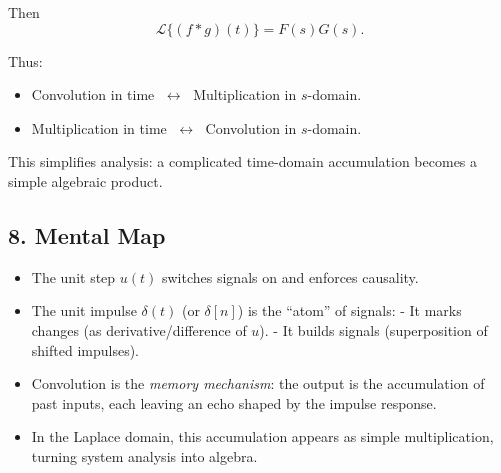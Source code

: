 \documentclass[12pt,a4paper]{article}
\begin{document}
		Then
		$$
		\mathcal{L}\{(f*g)(t)\} = F(s)G(s).
		$$
		
		Thus:
		\begin{itemize}
			\item Convolution in time $\;\longleftrightarrow\;$ Multiplication in $s$-domain.
			\item Multiplication in time $\;\longleftrightarrow\;$ Convolution in $s$-domain.
		\end{itemize}
		
		This simplifies analysis: a complicated time-domain accumulation becomes a simple algebraic product.
		
		
		\subsection*{8. Mental Map}
		
		\begin{itemize}
			\item The unit step $u(t)$ switches signals on and enforces causality.
			\item The unit impulse $\delta(t)$ (or $\delta[n]$) is the ``atom'' of signals:  
			- It marks changes (as derivative/difference of $u$).  
			- It builds signals (superposition of shifted impulses).
			\item Convolution is the \emph{memory mechanism}: the output is the accumulation of past inputs, each leaving an echo shaped by the impulse response.
			\item In the Laplace domain, this accumulation appears as simple multiplication, turning system analysis into algebra.
		\end{itemize}
		
	
	
	
\end{document}
